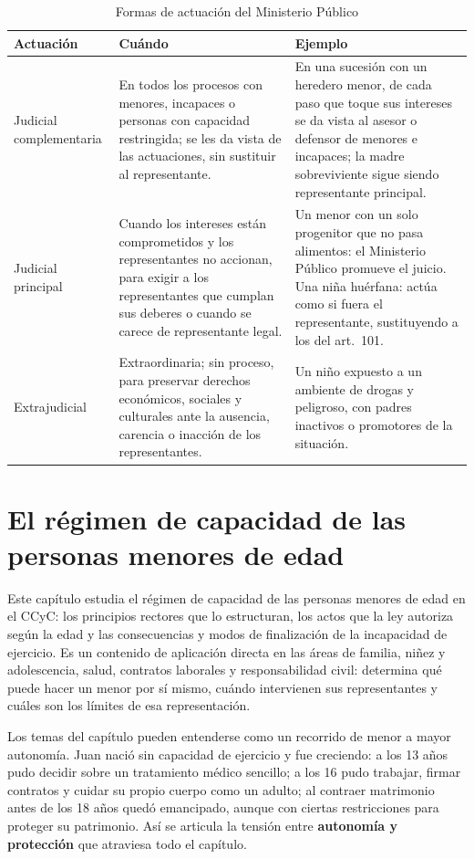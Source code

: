 \documentclass[12pt,oneside]{book}
\begin{document}
\begin{table}[H]
\centering
\begin{tabularx}{\textwidth}{B{0.20\textwidth} Y Y}
\toprule
\textbf{Actuación} & \textbf{Cuándo} & \textbf{Ejemplo} \\
\midrule
Judicial complementaria & En todos los procesos con menores, incapaces o personas con capacidad restringida; se les da vista de las actuaciones, sin sustituir al representante. & En una sucesión con un heredero menor, de cada paso que toque sus intereses se da vista al asesor o defensor de menores e incapaces; la madre sobreviviente sigue siendo representante principal. \\
Judicial principal & Cuando los intereses están comprometidos y los representantes no accionan, para exigir a los representantes que cumplan sus deberes o cuando se carece de representante legal. & Un menor con un solo progenitor que no pasa alimentos: el Ministerio Público promueve el juicio. Una niña huérfana: actúa como si fuera el representante, sustituyendo a los del art.~101. \\
Extrajudicial & Extraordinaria; sin proceso, para preservar derechos económicos, sociales y culturales ante la ausencia, carencia o inacción de los representantes. & Un niño expuesto a un ambiente de drogas y peligroso, con padres inactivos o promotores de la situación. \\
\bottomrule
\end{tabularx}
\caption{Formas de actuación del Ministerio Público}
\end{table}

\chapter{El régimen de capacidad de las personas menores de edad}
\label{cap:menores}

Este capítulo estudia el régimen de capacidad de las personas menores de edad en el CCyC: los principios rectores que lo estructuran, los actos que la ley autoriza según la edad y las consecuencias y modos de finalización de la incapacidad de ejercicio. Es un contenido de aplicación directa en las áreas de familia, niñez y adolescencia, salud, contratos laborales y responsabilidad civil: determina qué puede hacer un menor por sí mismo, cuándo intervienen sus representantes y cuáles son los límites de esa representación.

\begin{ejemplo}
Los temas del capítulo pueden entenderse como un recorrido de menor a mayor autonomía. Juan nació sin capacidad de ejercicio y fue creciendo: a los 13 años pudo decidir sobre un tratamiento médico sencillo; a los 16 pudo trabajar, firmar contratos y cuidar su propio cuerpo como un adulto; al contraer matrimonio antes de los 18 años quedó emancipado, aunque con ciertas restricciones para proteger su patrimonio. Así se articula la tensión entre \textbf{autonomía y protección} que atraviesa todo el capítulo.
\end{ejemplo}
\end{document}
